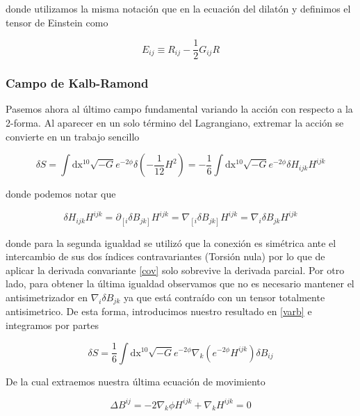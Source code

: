 \documentclass{article}
\numberwithin{equation}{section}
\begin{document}
donde utilizamos la misma notación que en la ecuación del dilatón y definimos el tensor de Einstein como

\begin{equation}\label{E}
E_{ij} \equiv R_{ij} - \frac{1}{2} G_{ij} R
\end{equation}

\subsubsection{Campo de Kalb-Ramond}

Pasemos ahora al último campo fundamental variando la acción con respecto a la 2-forma. Al aparecer en un solo término del Lagrangiano, extremar la acción se convierte en un trabajo sencillo

\begin{equation}\label{varb}
\delta S = \int\mathrm{dx^{10}}\sqrt{-G} e^{-2\phi} \delta \left( -\frac{1}{12}H^2\right) = -\frac{1}{6}\int\mathrm{dx^{10}}\sqrt{-G} e^{-2\phi} \delta H_{i j k} H^{i j k}
\end{equation}

donde podemos notar que

\begin{equation}\label{key}
\delta H_{i j k} H^{i j k} = \partial_{\left[ i \right.}\delta B_{\left. j k\right]} H^{i j k}  = \nabla_{\left[ i \right.}\delta B_{\left. j k\right]} H^{i j k} = \nabla_i \delta B_{j k} H^{i j k}
\end{equation}

donde para la segunda igualdad se utilizó que la conexión es simétrica ante el intercambio de sus dos índices contravariantes (Torsión nula) por lo que de aplicar la derivada convariante \ref{cov} solo sobrevive la derivada parcial. Por otro lado, para obtener la última igualdad observamos que no es necesario mantener el antisimetrizador en $ \nabla_i \delta B_{j k} $ ya que está contraído con un tensor totalmente antisimetrico. De esta forma, introducimos nuestro resultado en \ref{varb} e integramos por partes 

\begin{equation}\label{key}
\delta S =\frac{1}{6}\int\mathrm{dx^{10}}\sqrt{-G} e^{-2\phi}  \nabla_k  \left( e^{-2 \phi} H^{ij k}\right) \delta B_{ij} 
\end{equation}

De la cual extraemos nuestra última ecuación de movimiento

\begin{boxquation}
\begin{equation}\label{key}
\Delta B^{ij} = -2 \nabla_k \phi  H^{ijk} +  \nabla_k H^{ijk}=0
\end{equation}
\end{boxquation}
\end{document}
